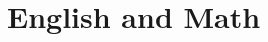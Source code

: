 \documentclass[../../main.tex]{subfiles} %
\begin{document}
\section{English and Math}

\blindmathpaper{}
\end{document}
